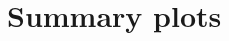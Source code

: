 \documentclass[a4paper,10pt,oneside]{book}
\begin{document}



\chapter{Summary plots}



%
%

%

%

%
\end{document}

